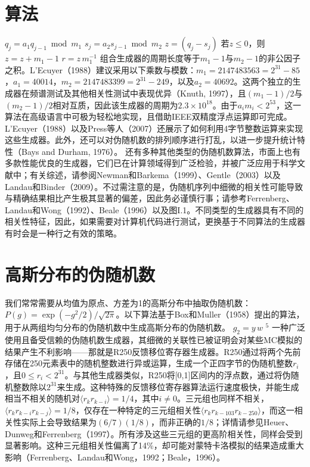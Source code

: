 \section{算法}\label{ux7b97ux6cd5}
\(q_{j}=a_{1}q_{j-1}\bmod m_{1}\)
\(s_{j}=a_{2}s_{j-1}\bmod m_{2}\)
\(z=(q_{j}-s_{j})\)
若\(z\leq0\)，则\(z=z+m_{1}-1\)
\(r=z\,m_{1}^{-1}\)
组合生成器的周期长度等于\(m_{1}-1\)与\(m_{2}-1\)的非公因子之积。L'Ecuyer（1988）建议采用以下乘数与模数：\(m_{1}=2147483563=2^{31}-85\)，\(a_{1}=40014\)，\(m_{2}=2147483399=2^{31}-249\)，以及\(a_{2}=40692\)。这两个独立的生成器在频谱测试及其他相关性测试中表现优异（Knuth, 1997），且\((m_{1}-1)/2\)与\((m_{2}-1)/2\)相对互质，因此该生成器的周期为\(2.3\times10^{18}\)。由于\(a_{i}m_{i}<2^{53}\)，这一算法在高级语言中可极为轻松地实现，且借助IEEE双精度浮点运算即可完成。L'Ecuyer（1988）以及Press等人（2007）还展示了如何利用4字节整数运算来实现这些生成器。此外，还可以对伪随机数的排列顺序进行打乱，以进一步提升统计特性（Bays and Durham, 1976）。
还有多种其他类型的伪随机数算法，市面上也有多款性能优良的生成器，它们已在计算领域得到广泛检验，并被广泛应用于科学文献中；有关综述，请参阅Newman和Barkema（1999）、Gentle（2003）以及Landau和Binder（2009）。不过需注意的是，伪随机序列中细微的相关性可能导致与精确结果相比产生极其显著的偏差，因此务必谨慎行事；请参考Ferrenberg、Landau和Wong（1992）、Beale（1996）以及图I.1。不同类型的生成器具有不同的相关性特征，因此，如果需要对计算机代码进行测试，更换基于不同算法的生成器有时会是一种行之有效的策略。
\section{高斯分布的伪随机数}\label{ux9ad8ux65afux5206ux5e03ux7684ux4f2aux968fux673aux6570}
我们常常需要从均值为原点、方差为1的高斯分布中抽取伪随机数：\(P(g)=\exp(-g^{2}/2)/\sqrt{2\pi}\)。以下算法基于Box和Muller（1958）提出的算法，用于从两组均匀分布的伪随机数中生成高斯分布的伪随机数。
\(g_{2}=y\,w\)
\(^{5}\) 一种广泛使用且备受信赖的伪随机数生成器，其细微的关联性已被证明会对某些MC模拟的结果产生不利影响——那就是R250反馈移位寄存器生成器。R250通过将两个先前存储在250元素表中的随机整数进行异或运算，生成一个正四字节的伪随机整数\(r_{i}\)，且\(0 \leq r_{i} < 2^{31}\)。与其他生成器类似，R250将{[}0,1{]}区间内的浮点数，通过将伪随机整数除以\(2^{31}\)来生成。这种特殊的反馈移位寄存器算法运行速度极快，并能生成相当不相关的随机对\(\langle r_{k}r_{k-i} \rangle = 1/4\)，其中\(i \neq 0\)。三元组也同样不相关，\(\langle r_{k}r_{k-i}r_{k-j} \rangle = 1/8\)，仅存在一种特定的三元组相关性\(\langle r_{k}r_{k-103}r_{k-250} \rangle\)，而这一相关性实际上会导致结果为\((6/7)(1/8)\)，而非正确的\(1/8\)；详情请参见Heuer、Dunweg和Ferrenberg（1997）。所有涉及这些三元组的更高阶相关性，同样会受到显著影响。这种三元组相关性偏离了14\%，却可能对蒙特卡洛模拟的结果造成重大影响（Ferrenberg、Landau和Wong，1992；Beale，1996）。

